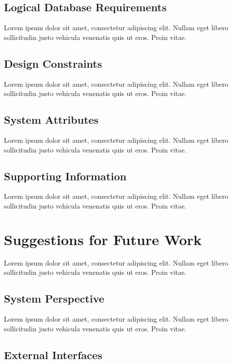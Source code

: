 \documentclass[a4paper]{article}
\begin{document}
        \subsection{Logical Database Requirements}

        Lorem ipsum dolor sit amet, consectetur adipiscing elit. Nullam eget libero sollicitudin justo vehicula venenatis quis ut eros. Proin vitae.

        \subsection{Design Constraints}

        Lorem ipsum dolor sit amet, consectetur adipiscing elit. Nullam eget libero sollicitudin justo vehicula venenatis quis ut eros. Proin vitae.

        \subsection{System Attributes}

        Lorem ipsum dolor sit amet, consectetur adipiscing elit. Nullam eget libero sollicitudin justo vehicula venenatis quis ut eros. Proin vitae.

        \subsection{Supporting Information}

        Lorem ipsum dolor sit amet, consectetur adipiscing elit. Nullam eget libero sollicitudin justo vehicula venenatis quis ut eros. Proin vitae.

    \section{Suggestions for Future Work}

    Lorem ipsum dolor sit amet, consectetur adipiscing elit. Nullam eget libero sollicitudin justo vehicula venenatis quis ut eros. Proin vitae.

        \subsection{System Perspective}

        Lorem ipsum dolor sit amet, consectetur adipiscing elit. Nullam eget libero sollicitudin justo vehicula venenatis quis ut eros. Proin vitae.

        \subsection{External Interfaces}
\end{document}
